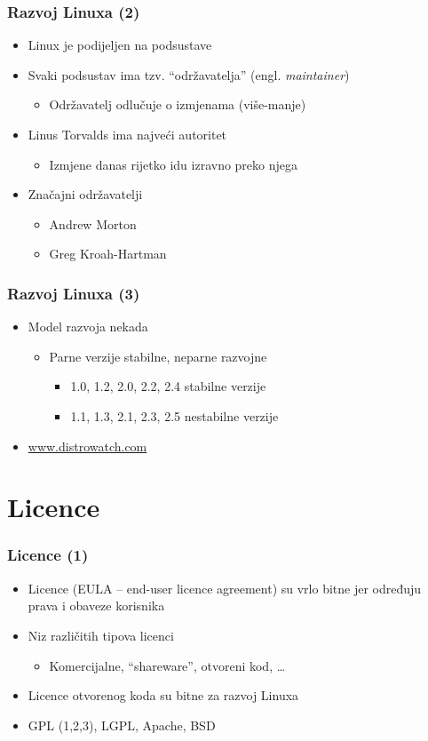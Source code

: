 \documentclass{beamer}
\begin{document}
\begin{frame}[t]
\frametitle{Razvoj Linuxa (2)}
\begin{itemize}
  \item Linux je podijeljen na podsustave
  \item Svaki podsustav ima tzv. ``održavatelja'' (engl.
        \emph{maintainer})
  \begin{itemize}
    \item Održavatelj odlučuje o izmjenama (više-manje)
  \end{itemize}
  \item Linus Torvalds ima najveći autoritet
  \begin{itemize}
    \item Izmjene danas rijetko idu izravno preko njega
  \end{itemize}
  \item Značajni održavatelji
  \begin{itemize}
    \item Andrew Morton
    \item Greg Kroah-Hartman
  \end{itemize}
\end{itemize}
\end{frame}

\begin{frame}[t]
\frametitle{Razvoj Linuxa (3)}
\begin{itemize}
  \item Model razvoja nekada
  \begin{itemize}
    \item Parne verzije stabilne, neparne razvojne
    \begin{itemize}
      \item 1.0, 1.2, 2.0, 2.2, 2.4 stabilne verzije
      \item 1.1, 1.3, 2.1, 2.3, 2.5 nestabilne verzije
    \end{itemize}
  \end{itemize}
  \item \url{www.distrowatch.com}
\end{itemize}
\end{frame}

\section{Licence}
\begin{frame}[t]
\frametitle{Licence (1)}
\begin{itemize}
  \item Licence (EULA -- end-user licence agreement) su vrlo bitne jer
        određuju prava i obaveze korisnika
  \item Niz različitih tipova licenci
  \begin{itemize}
    \item Komercijalne, ``shareware'', otvoreni kod, \ldots
  \end{itemize}
  \item Licence otvorenog koda su bitne za razvoj Linuxa
  \item GPL (1,2,3), LGPL, Apache, BSD
\end{itemize}
\end{frame}
\end{document}
